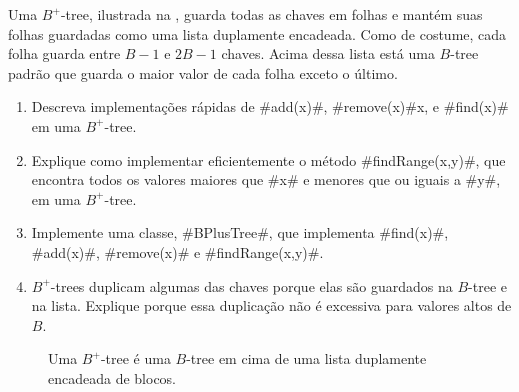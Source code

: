 \begin{exc}
  Uma $B^+$-tree, ilustrada na , guarda todas as chaves em folhas e mantém suas folhas guardadas como uma lista duplamente encadeada. 
Como de costume, cada folha guarda entre $B-1$ e $2B-1$ chaves.  
  Acima dessa lista está uma 
  $B$-tree padrão que guarda o maior valor de cada folha exceto o último. 
  \begin{enumerate}
    \item Descreva implementações rápidas de #add(x)#, #remove(x)#x,
      e #find(x)# em uma $B^+$-tree.
    \item Explique como implementar eficientemente o método #findRange(x,y)#,
      que encontra todos os valores maiores que #x# e menores que ou iguais a #y#, 
      em uma $B^+$-tree.
    \item Implemente uma classe, #BPlusTree#, que implementa #find(x)#,
      #add(x)#, #remove(x)# e #findRange(x,y)#.
    \item $B^+$-trees duplicam algumas das chaves porque elas são guardados na
      $B$-tree e na lista. Explique porque essa duplicação não é excessiva para
      valores altos de $B$.
  \end{enumerate}
\end{exc}

\begin{figure}
  \caption{Uma $B^+$-tree é uma $B$-tree em cima de uma lista duplamente encadeada de blocos.}
\end{figure}


